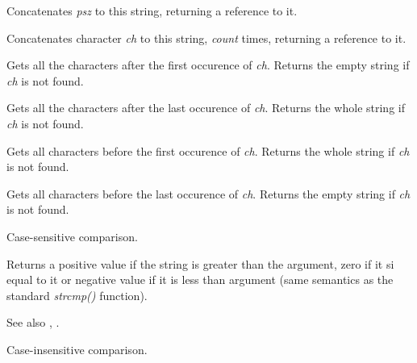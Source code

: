 {Concatenates {\it psz} to this string, returning a reference to it.


Concatenates character {\it ch} to this string, {\it count} times, returning a reference
to it.

\label{wxstringafterfirst}


Gets all the characters after the first occurence of {\it ch}.
Returns the empty string if {\it ch} is not found.

\label{wxstringafterlast}


Gets all the characters after the last occurence of {\it ch}.
Returns the whole string if {\it ch} is not found.

\label{wxstringbeforefirst}


Gets all characters before the first occurence of {\it ch}.
Returns the whole string if {\it ch} is not found.

\label{wxstringbeforelast}


Gets all characters before the last occurence of {\it ch}.
Returns the empty string if {\it ch} is not found.

\label{wxstringcmp}


Case-sensitive comparison.

Returns a positive value if the string is greater than the argument, zero if
it si equal to it or negative value if it is less than argument (same semantics
as the standard {\it strcmp()} function).

See also , .

\label{wxstringcmpnocase}


Case-insensitive comparison.

}
